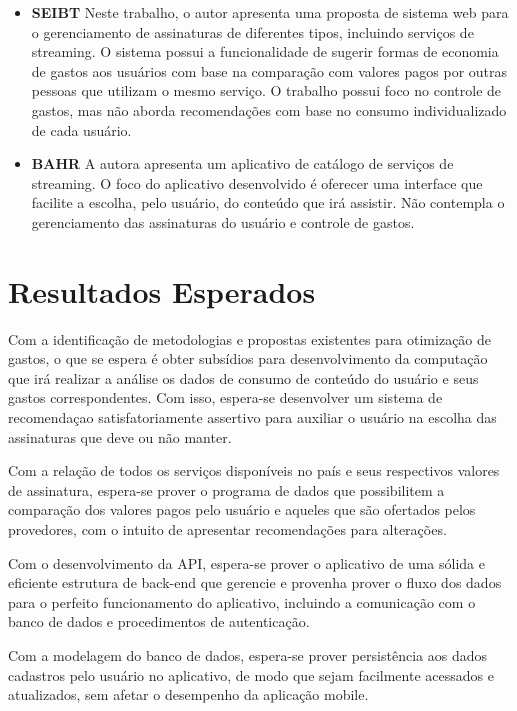 \documentclass[conference]{IEEEtran}
\begin{document}
\begin{itemize}
\item \textbf{SEIBT} \cite{b6} Neste trabalho, o autor apresenta uma proposta de sistema web para o gerenciamento de assinaturas de diferentes tipos, incluindo serviços de streaming. O sistema possui a funcionalidade de sugerir formas de economia de gastos aos usuários com base na comparação com valores pagos por outras pessoas que utilizam o mesmo serviço. O trabalho possui foco no controle de gastos, mas não aborda recomendações com base no consumo individualizado de cada usuário. 

\item \textbf{BAHR} \cite{b7} A autora apresenta um aplicativo de catálogo de serviços de streaming. O foco do aplicativo desenvolvido é oferecer uma interface que facilite a escolha, pelo usuário, do conteúdo que irá assistir. Não contempla o gerenciamento das assinaturas do usuário e controle de gastos. 

\end{itemize}  

\section{Resultados Esperados}

Com a identificação de metodologias e propostas existentes para otimização de gastos, o que se espera é obter subsídios para desenvolvimento da computação que irá realizar a análise os dados de consumo de conteúdo do usuário e seus gastos correspondentes. Com isso, espera-se desenvolver um sistema de recomendaçao satisfatoriamente assertivo para auxiliar o usuário na escolha das assinaturas que deve ou não manter.

Com a relação de todos os serviços disponíveis no país e seus respectivos valores de assinatura, espera-se prover o programa de dados que possibilitem a comparação dos valores pagos pelo usuário e aqueles que são ofertados pelos provedores, com o intuito de apresentar recomendações para alterações.

Com o desenvolvimento da API, espera-se prover o aplicativo de uma sólida e eficiente estrutura de back-end que gerencie e provenha prover o fluxo dos dados para o perfeito funcionamento do aplicativo, incluindo a comunicação com o banco de dados e procedimentos de autenticação.

Com a modelagem do banco de dados, espera-se prover persistência aos dados cadastros pelo usuário no aplicativo, de modo que sejam facilmente acessados e atualizados, sem afetar o desempenho da aplicação mobile.
\end{document}
